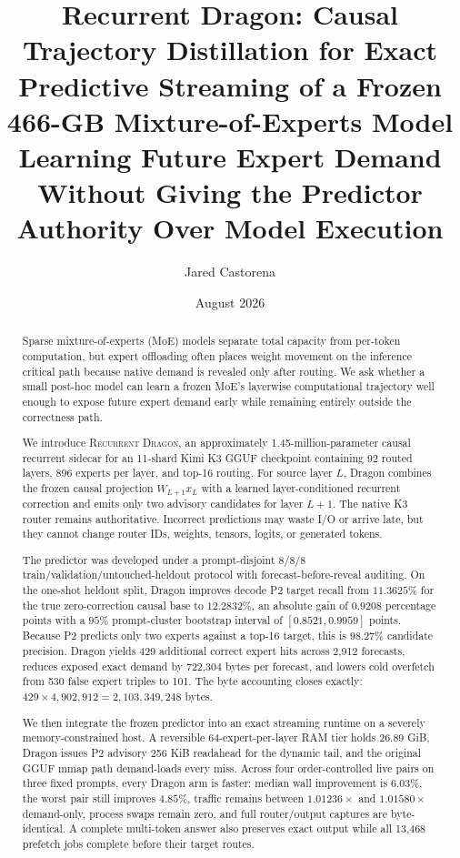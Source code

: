 \documentclass[11pt]{article}
\title{\Large\bfseries Recurrent Dragon: Causal Trajectory Distillation for Exact Predictive Streaming of a Frozen 466-GB Mixture-of-Experts Model\\[0.4em]
\large Learning Future Expert Demand Without Giving the Predictor Authority Over Model Execution}
\author{Jared Castorena}
\affil{1728 Studios LLC}
\date{August 2026}
\newcommand{\Dragon}{\textsc{Recurrent Dragon}\xspace}
\begin{document}
\maketitle

\begin{abstract}
Sparse mixture-of-experts (MoE) models separate total capacity from per-token computation, but expert offloading often places weight movement on the inference critical path because native demand is revealed only after routing. We ask whether a small post-hoc model can learn a frozen MoE's layerwise computational trajectory well enough to expose future expert demand early while remaining entirely outside the correctness path.

We introduce \Dragon, an approximately 1.45-million-parameter causal recurrent sidecar for an 11-shard Kimi K3 GGUF checkpoint containing 92 routed layers, 896 experts per layer, and top-16 routing. For source layer $L$, Dragon combines the frozen causal projection $W_{L+1}x_L$ with a learned layer-conditioned recurrent correction and emits only two advisory candidates for layer $L+1$. The native K3 router remains authoritative. Incorrect predictions may waste I/O or arrive late, but they cannot change router IDs, weights, tensors, logits, or generated tokens.

The predictor was developed under a prompt-disjoint $8/8/8$ train/validation/untouched-heldout protocol with forecast-before-reveal auditing. On the one-shot heldout split, Dragon improves decode P2 target recall from $11.3625\%$ for the true zero-correction causal base to $12.2832\%$, an absolute gain of $0.9208$ percentage points with a $95\%$ prompt-cluster bootstrap interval of $[0.8521,0.9959]$ points. Because P2 predicts only two experts against a top-16 target, this is $98.27\%$ candidate precision. Dragon yields 429 additional correct expert hits across 2,912 forecasts, reduces exposed exact demand by 722,304 bytes per forecast, and lowers cold overfetch from 530 false expert triples to 101. The byte accounting closes exactly: $429\times4{,}902{,}912=2{,}103{,}349{,}248$ bytes.

We then integrate the frozen predictor into an exact streaming runtime on a severely memory-constrained host. A reversible 64-expert-per-layer RAM tier holds 26.89 GiB, Dragon issues P2 advisory 256 KiB readahead for the dynamic tail, and the original GGUF mmap path demand-loads every miss. Across four order-controlled live pairs on three fixed prompts, every Dragon arm is faster: median wall improvement is $6.03\%$, the worst pair still improves $4.85\%$, traffic remains between $1.01236\times$ and $1.01580\times$ demand-only, process swaps remain zero, and full router/output captures are byte-identical. A complete multi-token answer also preserves exact output while all 13,468 prefetch jobs complete before their target routes.


\end{abstract}
\end{document}
